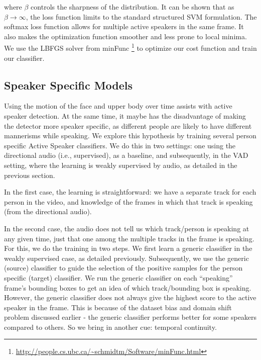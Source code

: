 \documentclass[runningheads]{llncs}
\begin{document}
where $\beta$ controls the sharpness of the distribution. It can be shown that as $\beta \rightarrow \infty$, the loss function limits to the standard structured SVM formulation.
The softmax loss function allows for multiple active speakers in the same frame. It also
makes the optimization function smoother and less prone to local minima. We use the LBFGS solver from minFunc \footnote{\url{http://people.cs.ubc.ca/~schmidtm/Software/minFunc.html}
} to optimize our cost function and train our classifier.


\subsection{Speaker Specific Models}
\label{speakerSpecificModels}

Using the motion of the face and upper body over time assists with active speaker detection. At the same time, it maybe has the disadvantage of making the detector more speaker specific, as different people are likely to have different mannerisms while speaking. We explore this hypothesis by training several person specific Active Speaker classifiers.
We do this in two settings: one using the directional audio (i.e., supervised), as a baseline, and subsequently, in the VAD setting, where the learning is weakly supervised by audio, as detailed in the previous section.

In the first case, the learning is straightforward: we have a separate track for each person in the video, and knowledge of the frames in which that track is speaking (from the directional audio). %

In the second case, the audio does not tell us which track/person is speaking at any given time, just that one among the multiple tracks in the frame is speaking. 
For this, we do the training in two steps. We first learn a generic classifier in the weakly supervised case, as detailed previously. Subsequently, we use the generic (source) classifier to guide the selection of the positive samples for the person specific (target) classifier. We run the generic classifier on each ``speaking'' frame's bounding boxes to get an idea of which track/bounding box is speaking.
However, the generic classifier does not always give the highest score to the active speaker in the frame. This is because of the dataset bias and domain shift problem discussed earlier - the generic classifier performs better for some speakers compared to others. So we bring in another cue: temporal continuity.
\end{document}
